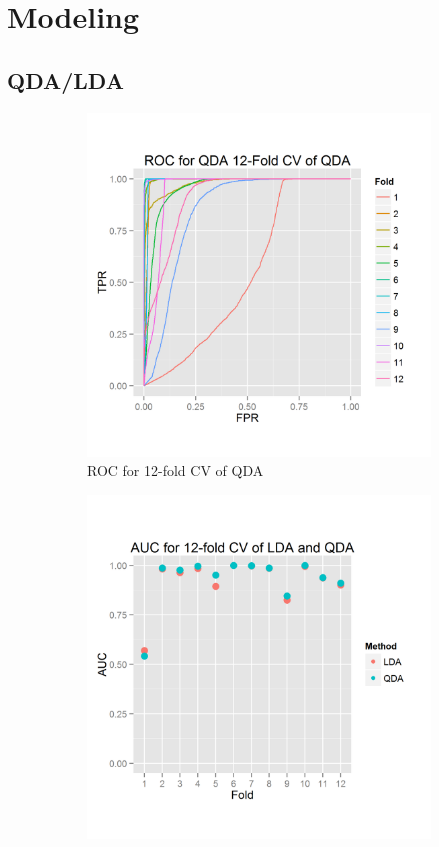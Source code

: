 \documentclass{article}\usepackage[]{graphicx}\usepackage[]{color}
\begin{document}
\section{Modeling}

\subsection{QDA/LDA}

\begin{figure}[h]
  \centering 
  \begin{subfigure}[b]{0.3\textwidth}
    \includegraphics[width=\linewidth]{ROC_12_folds_DA.png}
    \caption{ROC for 12-fold CV of QDA}
    \label{12-foldROC}
  \end{subfigure}  
  \begin{subfigure}[b]{0.3\textwidth}
    \includegraphics[width=\linewidth]{AUC_12_folds_DA.png}

\end{subfigure}
\end{figure}
\end{document}

